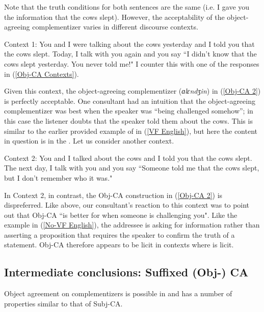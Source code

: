 \documentclass[output=paper
,newtxmath
,modfonts
,nonflat]{langsci/langscibook}
\begin{document}
\noindent Note that the truth conditions for both sentences are the same (i.e. I gave you the information that the cows slept). However, the acceptability of the object-agreeing complementizer varies in different discourse contexts.

\ea %
Context 1: You and I were talking about the cows yesterday and I told you that the cows slept. Today, I talk with you again and you say ``I didn't know that the cows slept yesterday. You never told me!" I counter this with one of the responses in (\ref{Obj-CA Contexts}).
\z

\noindent Given this context, the object-agreeing complementizer (\textit{ɑlɛndʒin}) in (\ref{Obj-CA 2}) is perfectly acceptable. One consultant had an intuition that the object-agreeing complementizer was best when the speaker was ``being challenged somehow''; in this case the listener doubts that the speaker told them about the cows. This is similar to the earlier provided example of  in (\ref{VF English}), but here the content in question is in the . Let us consider another context.

\ea %
Context 2: You and I talked about the cows and I told you that the cows slept. The next day, I talk with you and you say ``Someone told me that the cows slept, but I don't remember who it was."
\z

\noindent In Context 2, in contrast, the Obj-CA construction in (\ref{Obj-CA 2}) is dispreferred. Like above, our consultant's reaction to this context was to point out that Obj-CA ``is better for when someone is challenging you". Like the example in (\ref{No-VF English}), the addressee is asking for information rather than asserting a proposition that requires the speaker to confirm the truth of a statement. Obj-CA therefore appears to be licit in contexts where  is licit.


\subsection{Intermediate conclusions: Suffixed (Obj-) CA}

Object agreement on complementizers is possible in  and has a number of properties similar to that of Subj-CA.
\end{document}
